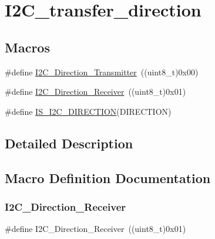 \hypertarget{group___i2_c__transfer__direction}{}\section{I2\+C\+\_\+transfer\+\_\+direction}
\label{group___i2_c__transfer__direction}
\subsection*{Macros}
\begin{DoxyCompactItemize}
\item 
\#define \mbox{\hyperlink{group___i2_c__transfer__direction_ga9895ee2d7d8cc8ba4daafafa1c3ce1ac}{I2\+C\+\_\+\+Direction\+\_\+\+Transmitter}}~((uint8\+\_\+t)0x00)
\item 
\#define \mbox{\hyperlink{group___i2_c__transfer__direction_gafe3b9b98552980ca56c8e21a90040fa0}{I2\+C\+\_\+\+Direction\+\_\+\+Receiver}}~((uint8\+\_\+t)0x01)
\item 
\#define \mbox{\hyperlink{group___i2_c__transfer__direction_ga33368efe652bc25b4f4b74f02ce0657e}{I\+S\+\_\+\+I2\+C\+\_\+\+D\+I\+R\+E\+C\+T\+I\+ON}}(D\+I\+R\+E\+C\+T\+I\+ON)
\end{DoxyCompactItemize}


\subsection{Detailed Description}


\subsection{Macro Definition Documentation}
\mbox{\label{group___i2_c__transfer__direction_gafe3b9b98552980ca56c8e21a90040fa0}} 
\subsubsection{\texorpdfstring{I2C\_Direction\_Receiver}{I2C\_Direction\_Receiver}}
{\footnotesize\ttfamily \#define I2\+C\+\_\+\+Direction\+\_\+\+Receiver~((uint8\+\_\+t)0x01)}

\mbox{\label{group___i2_c__transfer__direction_ga9895ee2d7d8cc8ba4daafafa1c3ce1ac}} 
